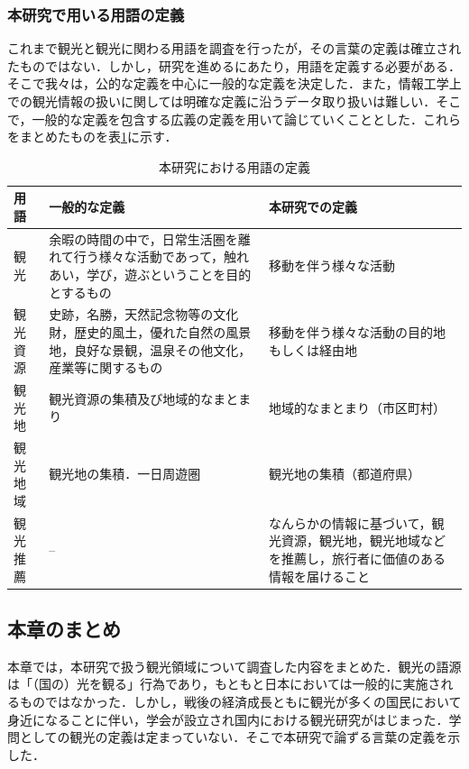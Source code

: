 \documentclass{jsarticle}
\begin{document}
\subsubsection{本研究で用いる用語の定義}

これまで観光と観光に関わる用語を調査を行ったが，その言葉の定義は確立されたものではない．しかし，研究を進めるにあたり，用語を定義する必要がある．そこで我々は，公的な定義を中心に一般的な定義を決定した．また，情報工学上での観光情報の扱いに関しては明確な定義に沿うデータ取り扱いは難しい．そこで，一般的な定義を包含する広義の定義を用いて論じていくこととした．これらをまとめたものを表\ref{define_of_tourism}に示す．

\begin{table}[!h]
\small
\caption{本研究における用語の定義}
\begin{center}
\begin{tabular}{lp{}p{}}
\label{define_of_tourism}
用語 & 一般的な定義 & 本研究での定義 \\ \hline
観光        & 余暇の時間の中で，日常生活圏を離れて行う様々な活動であって，触れあい，学び，遊ぶということを目的とするもの        & 移動を伴う様々な活動 \\
観光資源    & 史跡，名勝，天然記念物等の文化財，歴史的風土，優れた自然の風景地，良好な景観，温泉その他文化，産業等に関するもの  & 移動を伴う様々な活動の目的地もしくは経由地 \\
観光地      & 観光資源の集積及び地域的なまとまり    & 地域的なまとまり（市区町村） \\
観光地域    & 観光地の集積．一日周遊圏              & 観光地の集積（都道府県） \\
観光推薦    & --                                    & なんらかの情報に基づいて，観光資源，観光地，観光地域などを推薦し，旅行者に価値のある情報を届けること
\end{tabular}
\end{center}
\end{table}

\subsection{本章のまとめ}

本章では，本研究で扱う観光領域について調査した内容をまとめた．観光の語源は「（国の）光を観る」行為であり，もともと日本においては一般的に実施されるものではなかった．しかし，戦後の経済成長ともに観光が多くの国民において身近になることに伴い，学会が設立され国内における観光研究がはじまった．学問としての観光の定義は定まっていない．そこで本研究で論ずる言葉の定義を示した．
\end{document}
